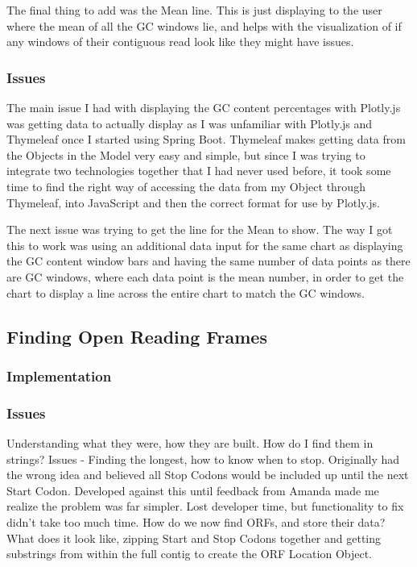 The final thing to add was the Mean line. This is just displaying to the user where the mean of all the GC windows lie, and helps with the visualization of if any windows of their contiguous read look like they might have issues.
\subsubsection{Issues}
The main issue I had with displaying the GC content percentages with Plotly.js was getting data to actually display as I was unfamiliar with Plotly.js and Thymeleaf once I started using Spring Boot. Thymeleaf makes getting data from the Objects in the Model very easy and simple, but since I was trying to integrate two technologies together that I had never used before, it took some time to find the right way of accessing the data from my Object through Thymeleaf, into JavaScript and then the correct format for use by Plotly.js.

The next issue was trying to get the line for the Mean to show. The way I got this to work was using an additional data input for the same chart as displaying the GC content window bars and having the same number of data points as there are GC windows, where each data point is the mean number, in order to get the chart to display a line across the entire chart to match the GC windows.

\subsection{Finding Open Reading Frames}
\subsubsection{Implementation}
\subsubsection{Issues}
Understanding what they were, how they are built. How do I find them in strings? Issues - Finding the longest, how to know when to stop. Originally had the wrong idea and believed all Stop Codons would be included up until the next Start Codon. Developed against this until feedback from Amanda made me realize the problem was far simpler. Lost developer time, but functionality to fix didn't take too much time. How do we now find ORFs, and store their data? What does it look like, zipping Start and Stop Codons together and getting substrings from within the full contig to create the ORF Location Object.

